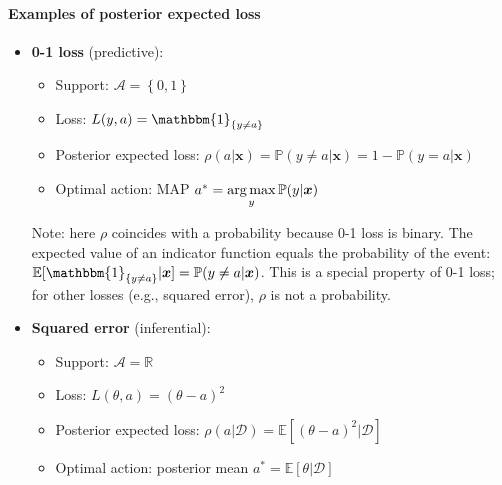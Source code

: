 \paragraph{Examples of posterior expected loss}
\begin{itemize}
    \item \textbf{0-1 loss} (predictive):
        \begin{itemize}
            \item Support: $\mathcal{A} = \left\{0, 1\right\}$
            \item Loss: $L(y, a) = \mathbbm{1}_{\{y \neq a\}}$
            \item Posterior expected loss: $\rho(a|\bm{x}) = \mathbb{P}(y \neq a|\bm{x}) = 1 - \mathbb{P}(y = a|\bm{x})$
            \item Optimal action: MAP $a^* = \displaystyle\operatorname*{arg\,max}_y \mathbb{P}(y|\bm{x})$
        \end{itemize}
        Note: here $\rho$ coincides with a probability because 0-1 loss is binary.
        The expected value of an indicator function equals the probability of the event:
        $\mathbb{E}[\mathbbm{1}_{\{y \neq a\}}|\bm{x}] = \mathbb{P}(y \neq a|\bm{x})$.
        This is a special property of 0-1 loss; for other losses (e.g., squared error),
        $\rho$ is not a probability.
    \item \textbf{Squared error} (inferential):
        \begin{itemize}
            \item Support: $\mathcal{A} = \mathbb{R}$
            \item Loss: $L(\theta, a) = (\theta - a)^2$
            \item Posterior expected loss: $\rho(a|\mathcal{D}) = \mathbb{E}[(\theta - a)^2 | \mathcal{D}]$
            \item Optimal action: posterior mean $a^* = \mathbb{E}[\theta|\mathcal{D}]$
        \end{itemize}
\end{itemize}

